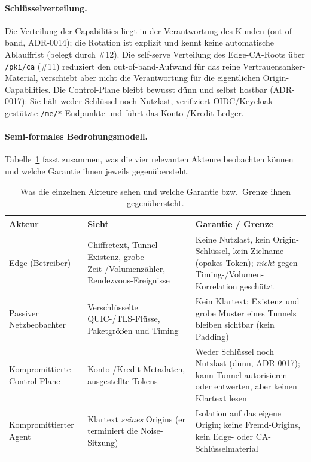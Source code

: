 \paragraph{Schlüsselverteilung.} Die Verteilung der Capabilities liegt in der
Verantwortung des Kunden (out-of-band, ADR-0014); die Rotation ist explizit und
kennt keine automatische Ablauffrist (belegt durch \#12). Die self-serve
Verteilung des Edge-CA-Roots über \texttt{/pki/ca} (\#11) reduziert den
out-of-band-Aufwand für das reine Vertrauensanker-Material, verschiebt aber nicht
die Verantwortung für die eigentlichen Origin-Capabilities. Die Control-Plane
bleibt bewusst dünn und selbst hostbar (ADR-0017): Sie hält weder Schlüssel noch
Nutzlast, verifiziert OIDC/Keycloak-gestützte \texttt{/me/*}-Endpunkte und führt
das Konto-/Kredit-Ledger.

\paragraph{Semi-formales Bedrohungsmodell.} Tabelle~\ref{tab:threat} fasst
zusammen, was die vier relevanten Akteure beobachten können und welche Garantie
ihnen jeweils gegenübersteht.

\begin{table}[t]
\centering
\caption{Was die einzelnen Akteure sehen und welche Garantie bzw.\ Grenze ihnen
gegenübersteht.}
\label{tab:threat}
\begin{tabular}{p{2.9cm}p{4.4cm}p{4.4cm}}
\toprule
Akteur & Sieht & Garantie / Grenze \\
\midrule
Edge (Betreiber) & Chiffretext, Tunnel-Existenz, grobe Zeit-/Volumen\-zähler,
Rendezvous-Ereignisse & Keine Nutzlast, kein Origin-Schlüssel, kein Zielname
(opakes Token); \emph{nicht} gegen Timing-/Volumen-Korrelation geschützt \\
Passiver Netzbeobachter & Verschlüsselte QUIC-/TLS-Flüsse, Paketgrößen und Timing
& Kein Klartext; Existenz und grobe Muster eines Tunnels bleiben sichtbar (kein
Padding) \\
Kompromittierte Control-Plane & Konto-/Kredit-Metadaten, ausgestellte Tokens &
Weder Schlüssel noch Nutzlast (dünn, ADR-0017); kann Tunnel autorisieren oder
entwerten, aber keinen Klartext lesen \\
Kompromittierter Agent & Klartext \emph{seines} Origins (er terminiert die
Noise-Sitzung) & Isolation auf das eigene Origin; keine Fremd-Origins, kein Edge-
oder CA-Schlüsselmaterial \\
\bottomrule
\end{tabular}
\end{table}

